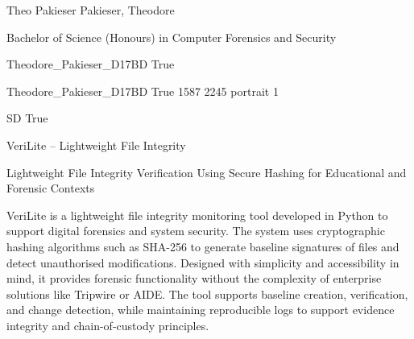 
\begingroup{}\relax



\def\Key{Theodore_Pakieser_D17BD}

{Theo Pakieser}
{Pakieser, Theodore}

{Bachelor of Science (Honours) in Computer Forensics and Security}

{Theodore_Pakieser_D17BD}
{True}

{Theodore_Pakieser_D17BD}
{True}
{1587}
{2245}
{portrait}
{1}

{SD}
{True}

{VeriLite – Lightweight File Integrity}

{Lightweight File Integrity Verification Using Secure Hashing for Educational and Forensic Contexts}

{VeriLite is a lightweight file integrity monitoring tool developed in Python to support digital forensics and system security. The system uses cryptographic hashing algorithms such as SHA-256 to generate baseline signatures of files and detect unauthorised modifications. Designed with simplicity and accessibility in mind, it provides forensic functionality without the complexity of enterprise solutions like Tripwire or AIDE. The tool supports baseline creation, verification, and change detection, while maintaining reproducible logs to support evidence integrity and chain-of-custody principles.}

